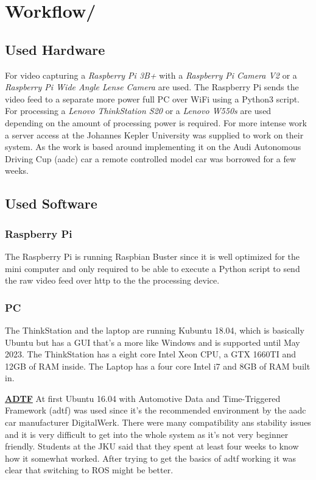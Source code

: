\chapter{Workflow\authorA/\authorB}


\section{Used Hardware\authorA}
For video capturing a \textit{Raspberry Pi 3B+} with a \textit{Raspberry Pi Camera V2} or a \textit{Raspberry Pi Wide Angle Lense Camera} are used. The Raspberry Pi sends the video feed to a separate more power full PC over WiFi using a Python3 script. \newline
For processing a \textit{Lenovo ThinkStation S20} or a \textit{Lenovo W550s} are used depending on the amount of processing power is required. For more intense work a server access at the Johannes Kepler University was supplied to work on their system. \newline
As the work is based around implementing it on the Audi Autonomous Driving Cup (\gls{aadc}) car a remote controlled model car was borrowed for a few weeks.

\section{Used Software\authorA}
\subsection{Raspberry Pi}
The Raspberry Pi is running Raspbian Buster since it is well optimized for the mini computer and only required to be able to execute a Python script to send the raw video feed over http to the the processing device.\newline
\subsection{PC}
The ThinkStation and the laptop are running Kubuntu 18.04, which is basically Ubuntu but has a GUI that's a more like Windows and is supported until May 2023. \newline
The ThinkStation has a eight core Intel Xeon CPU, a GTX 1660TI and 12GB of RAM inside. \newline
The Laptop has a four core Intel i7 and 8GB of RAM built in.\newline

\textbf{\underline{ADTF}} \newline
At first Ubuntu 16.04 with Automotive Data and Time-Triggered Framework (\gls{adtf}) was used since it's the recommended environment by the \gls{aadc} car manufacturer DigitalWerk. There were many compatibility ans stability issues and it is very difficult to get into the whole system as it's not very beginner friendly. Students at the JKU said that they spent at least four weeks to know how it somewhat worked. After trying to get the basics of \gls{adtf} working it was clear that switching to ROS might be better.

